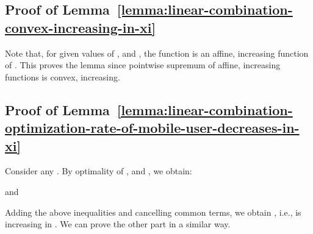 \documentclass[10pt,journal]{IEEEtran}
\begin{document}
 
 
 
 
 
 
 

 

\subsection{Proof of Lemma~\ref{lemma:linear-combination-convex-increasing-in-xi}}
\label{subsection:proof-of-linear-combination-convex-increasing-in-xi}
Note that, for given values of ,  and , the function  is an affine, increasing function of . 
This proves the lemma since pointwise supremum of affine, increasing functions is convex, increasing.


\subsection{Proof of Lemma~\ref{lemma:linear-combination-optimization-rate-of-mobile-user-decreases-in-xi}}
\label{subsection:proof-of-linear-combination-optimization-rate-of-mobile-user-decreases-in-xi}
Consider any . By optimality of ,  and , we obtain:

\footnotesize

\normalsize
and
 \footnotesize

\normalsize

Adding the above inequalities and cancelling common terms, we obtain 
, i.e., 
 is increasing in . We can prove the other part in a similar way.
 




 
 
 
 
 
 
 
 
 
 
 
 
 
 
 
\end{document}

